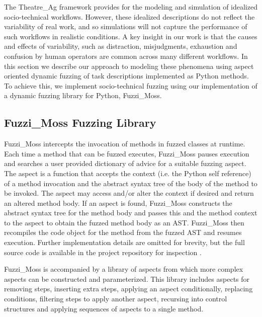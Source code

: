 \documentclass{llncs}
\begin{document}

The Theatre\_Ag framework provides for the modeling and simulation of idealized socio-technical workflows.  However, these
idealized descriptions do not reflect the variability of real work, and so simulations will not capture the performance
of such workflows in realistic conditions.  A key insight in our work is that the causes and effects of variability,
such as distraction, misjudgments, exhaustion and confusion by human operators are common across many different
workflows.  In this section we describe our approach to modeling these phenomena using aspect oriented dynamic fuzzing
of task descriptions implemented as Python methods.  To achieve this, we implement socio-technical fuzzing using our
implementation of a dynamic fuzzing library for Python, Fuzzi\_Moss.


\subsection{Fuzzi\_Moss Fuzzing Library}


Fuzzi\_Moss intercepts the invocation of methods in fuzzed classes at runtime.  Each time a method that can be fuzzed
executes, Fuzzi\_Moss pauses execution and searches a user provided dictionary of advice for a suitable fuzzing
aspect. The aspect is a function that accepts the context (i.e. the Python self reference) of a method invocation and
the abstract syntax tree of the body of the method to be invoked.  The aspect may access and/or alter the context if
desired and return an altered method body.  If an aspect is found, Fuzzi\_Moss constructs the abstract syntax tree for
the method body and passes this and the method context to the aspect to obtain the fuzzed method body as an AST.
Fuzzi\_Moss then recompiles the code object for the method from the fuzzed AST and resumes execution.  Further
implementation details are omitted for brevity, but the full source code is available in the project repository for
inspection \cite{wallis2016fuzzi-moss-scm}.

Fuzzi\_Moss is accompanied by a library of aspects from which more complex aspects can be constructed and parameterized.
This library includes aspects for removing steps, inserting extra steps, applying an aspect conditionally, replacing
conditions, filtering steps to apply another aspect, recursing into control structures and applying sequences of aspects
to a single method.
\end{document}
